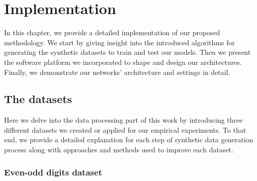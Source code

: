 
\chapter{Implementation}
\label{sec:implementation}
\noindent
In this chapter, we provide a detailed implementation of our proposed methodology. We start by giving insight into the introduced algorithms for generating the synthetic datasets to train and test our models. Then we present the software platform we incorporated to shape and design our architectures. Finally, we demonstrate our networks' architecture and settings in detail. 




\section{The datasets}
\label{dataha}

Here we delve into the data processing part of this work by introducing three different datasets we created or applied for our empirical experiments. To that end, we provide a detailed explanation for each step of synthetic data generation process along with approaches and methods used to improve each dataset.


\subsection{Even-odd digits dataset}
\label{subsubsec:digit}

